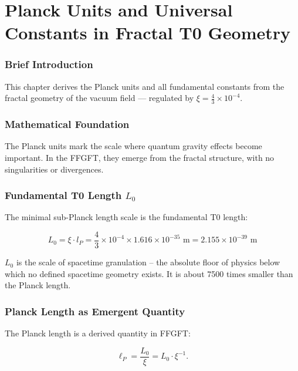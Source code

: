 \chapter{Planck Units and Universal Constants in Fractal T0 Geometry}


	
	\subsection*{Brief Introduction}
	
	This chapter derives the Planck units and all fundamental constants from the fractal geometry of the vacuum field — regulated by \(\xi = \frac{4}{3} \times 10^{-4}\).
	
	\subsection*{Mathematical Foundation}
	
	The Planck units mark the scale where quantum gravity effects become important. In the FFGFT, they emerge from the fractal structure, with no singularities or divergences.
	
	\subsection*{Fundamental T0 Length \(L_0\)}
	
	The minimal sub-Planck length scale is the fundamental T0 length:
	
	\begin{equation}
		\boxed{L_0 = \xi \cdot l_P = \frac{4}{3} \times 10^{-4} \times 1.616 \times 10^{-35} \text{ m} = 2.155 \times 10^{-39} \text{ m}}
	\end{equation}
	
	\(L_0\) is the scale of spacetime granulation -- the absolute floor of physics below which no defined spacetime geometry exists. It is about 7500 times smaller than the Planck length.
	
	\subsection*{Planck Length as Emergent Quantity}
	
	The Planck length is a derived quantity in FFGFT:
	
	\begin{equation}
		\ell_P = \frac{L_0}{\xi} = L_0 \cdot \xi^{-1}.
	\end{equation}
	
